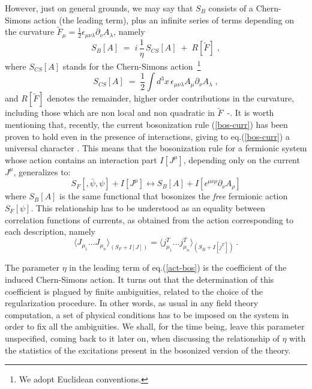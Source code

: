 \documentclass[a4paper,12pt]{article}
\begin{document}
However, just on general grounds, we may say that $S_B$
consists of a Chern-Simons action (the leading term), plus an infinite
series of terms depending on the curvature $\widetilde{F}_\mu
=\frac{1}{2}\epsilon_{\mu\nu\lambda} \partial_\nu A_\lambda$, namely
\begin{equation}
S_B[A]\;=\; i \,\frac{1}{\eta} \,S_{CS}[A]\;+\; R [\widetilde{F}]\;,
\label{act-bos1}
\end{equation}
where $S_{CS}[A]$ stands for the Chern-Simons action~\footnote{We
  adopt Euclidean conventions.}
\begin{equation}
 \label{c-s}
S_{CS}[A]\;=\;\frac{1}{2}\int d^3x \, \epsilon_{\mu\nu\lambda}A_\mu
\partial _\nu A_\lambda \;,
\end{equation}
and $R [\widetilde{F}]$ denotes the remainder, higher order
contributions in the curvature, including those which are non local and
non quadratic in $\widetilde{F}$~\cite{result1}-\cite{result6}.  It is
worth mentioning that, recently, the current bosonization rule
(\ref{bos-curr}) has been proven to hold even in the presence of
interactions, giving to eq.(\ref{bos-curr}) a universal character
\cite{result6}. This means that the bosonization rule for a fermionic
system whose action contains an interaction part $I[J^\mu]$, depending
only on the current $J^\mu$, generalizes to:
\begin{equation}
S_F[,{\bar\psi},\psi]+I[J^\mu] \leftrightarrow S_B[A]+I[\epsilon^{\mu
\nu \rho}\partial_\nu A_\rho]
\label{urules}
\end{equation}
where $S_B[A]$ is the same functional that bosonizes the {\it free}
fermionic action $S_F[\psi]$. This relationship has to be understood as
an equality between correlation functions of currents, as obtained from
the action corresponding to each description, namely
\begin{equation}
\langle J_{\mu_1} ... J_{\mu_n} \rangle_{(S_F+I[J])} = \langle
j^T_{\mu_1} ... j^T_{\mu_n} \rangle_{(S_B+I[j^T])} \ .
\label{univ-rules}
\end{equation}


The parameter $\eta$ in the leading term of eq.(\ref{act-bos}) is the
coefficient of the induced Chern-Simons action. It turns out that the
determination of this coefficient is plagued by finite ambiguities,
related to the choice of the regularization procedure. In other words,
as usual in any field theory computation, a set of physical conditions
has to be imposed on the system in order to fix all the ambiguities. We
shall, for the time being, leave this parameter unspecified, coming
back to it later on, when discussing the relationship of $\eta$ with
the statistics of the excitations present in the bosonized version of
the theory.
\end{document}
